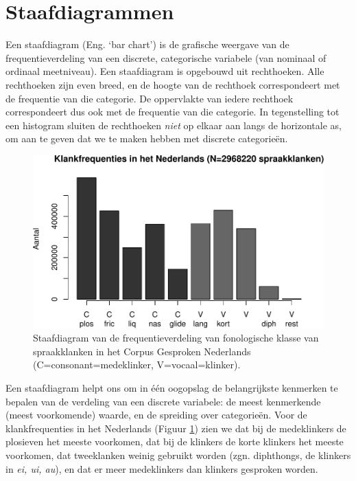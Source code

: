 \documentclass[
]{book}
\begin{document}
\hypertarget{sec:staafdiagrammen}{%
\section{Staafdiagrammen}\label{sec:staafdiagrammen}}

Een staafdiagram (Eng. `bar chart') is de grafische weergave van de
frequentieverdeling van een discrete, categorische variabele (van
nominaal of ordinaal meetniveau). Een staafdiagram is opgebouwd uit
rechthoeken. Alle rechthoeken zijn even breed, en de hoogte van de
rechthoek correspondeert met de frequentie van die categorie. De
oppervlakte van iedere rechthoek correspondeert dus ook met de
frequentie van die categorie. In tegenstelling tot een histogram sluiten
de rechthoeken \emph{niet} op elkaar aan langs de horizontale as, om aan te
geven dat we te maken hebben met discrete categorieën.

\begin{figure}
\centering
\includegraphics{MS1NL-boek_files/figure-latex/klankfreq-barplot-1.pdf}
\caption{\label{fig:klankfreq-barplot}Staafdiagram van de frequentieverdeling van fonologische klasse van spraakklanken in het Corpus Gesproken Nederlands (C=consonant=medeklinker, V=vocaal=klinker).}
\end{figure}

Een staafdiagram helpt ons om in één oogopslag de belangrijkste
kenmerken te bepalen van de verdeling van een discrete variabele: de
meest kenmerkende (meest voorkomende) waarde, en de spreiding over
categorieën. Voor de klankfrequenties in het Nederlands
(Figuur \ref{fig:klankfreq-barplot}) zien we dat bij de medeklinkers de
plosieven het meeste voorkomen, dat bij de klinkers de korte klinkers
het meeste voorkomen, dat tweeklanken weinig gebruikt worden (zgn.
diphthongs, de klinkers in \emph{ei, ui, au}), en dat er meer medeklinkers
dan klinkers gesproken worden.
\end{document}
